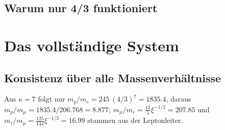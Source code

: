 	\subsection{Warum nur 4/3 funktioniert}
	
	\begin{table}[htbp]
		\centering
		\caption{Nur die Quarte (4/3) liefert konsistente Ergebnisse}
	\end{table}
	
	\section{Das vollständige System}
	
	\subsection{Konsistenz über alle Massenverhältnisse}
	
	\begin{table}[htbp]
		\centering
		\caption{Perfekte Konsistenz mit $\kappa = 7$ über 5 Größenordnungen}
	\end{table}
	Aus $\kappa = 7$ folgt nur $m_p/m_e = 245\,(4/3)^7 = 1835.4$, daraus $m_p/m_\mu = 1835.4/206.768 = 8.877$; $m_\mu/m_e = \tfrac{12}{5}\xi^{-1/2} = 207.85$ und $m_\tau/m_\mu = \tfrac{125}{144}\xi^{-1/3} = 16.99$ stammen aus der Leptonleiter.
	
